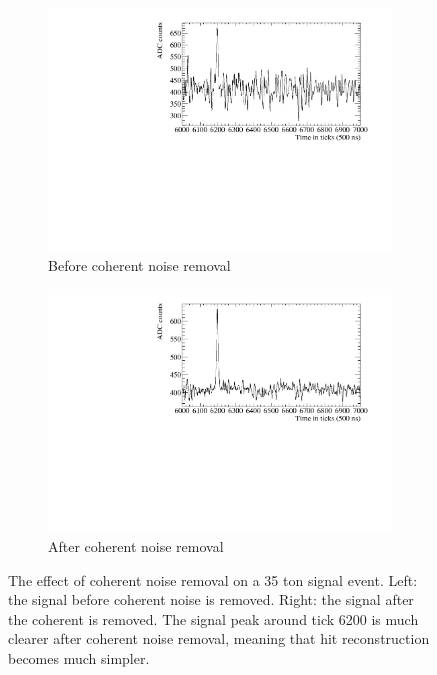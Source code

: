 \begin{figure}
  \centering
  \begin{subfigure}{0.48\textwidth}
    \centering
    \includegraphics[width=\textwidth]{BeforeCoherent}
    \caption{Before coherent noise removal}
  \end{subfigure}%
  \hspace{0.03\textwidth}%
  \begin{subfigure}{0.48\textwidth}
    \centering
    \includegraphics[width=\textwidth]{AfterCoherent}
    \caption{After coherent noise removal}
  \end{subfigure}
  \caption[Removing coherent noise in the 35 ton]
          {The effect of coherent noise removal on a 35 ton signal event. Left: the signal before coherent noise is removed. Right: the signal after the coherent is removed. The signal peak around tick 6200 is much clearer after coherent noise removal, meaning that hit reconstruction becomes much simpler.}
  \label{fig:CoherentNoise}
\end{figure}

